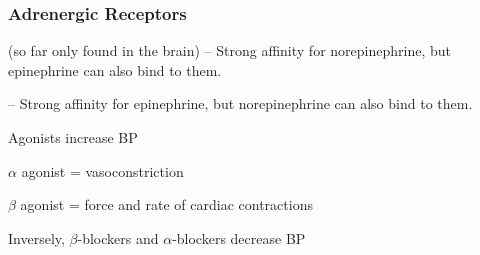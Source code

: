 \subsubsection{Adrenergic Receptors}

\begin{coloredlist}
    \item {} (so far only found in the brain) -- Strong affinity for norepinephrine, but epinephrine can also bind to them.
    \item {} -- Strong affinity for epinephrine, but norepinephrine can also bind to them.
    \item Agonists increase BP
    \begin{coloredlist}
        \item \(\alpha\) agonist = vasoconstriction
        \item \(\beta\) agonist = force and rate of cardiac contractions
    \end{coloredlist}
    \item Inversely, \(\beta\)-blockers and \(\alpha\)-blockers decrease BP
\end{coloredlist}